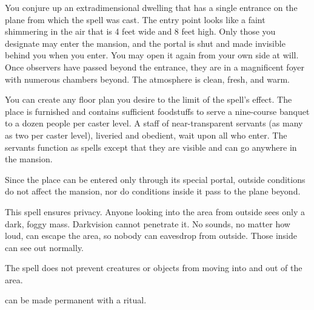 \spellrng{\rngclose}
\begin{spelleffect}
You conjure up an extradimensional dwelling that has a single entrance on the plane from which the spell was cast. The entry point looks like a faint shimmering in the air that is 4 feet wide and 8 feet high. Only those you designate may enter the mansion, and the portal is shut and made invisible behind you when you enter. You may open it again from your own side at will. Once observers have passed beyond the entrance, they are in a magnificent foyer with numerous chambers beyond. The atmosphere is clean, fresh, and warm.
\par You can create any floor plan you desire to the limit of the spell's effect. The place is furnished and contains sufficient foodstuffs to serve a nine-course banquet to a dozen people per caster level. A staff of near-transparent servants (as many as two per caster level), liveried and obedient, wait upon all who enter. The servants function as  spells except that they are visible and can go anywhere in the mansion.
\par Since the place can be entered only through its special portal, outside conditions do not affect the mansion, nor do conditions inside it pass to the plane beyond.
\end{spelleffect}

\spellrng{\rngclose}
\begin{spelleffect}
This spell ensures privacy. Anyone looking into the area from outside sees only a dark, foggy mass. Darkvision cannot penetrate it. No sounds, no matter how loud, can escape the area, so nobody can eavesdrop from outside. Those inside can see out normally.
\par The spell does not prevent creatures or objects from moving into and out of the area.
\end{spelleffect}
\begin{spellnotes}
 can be made permanent with a  ritual.
\end{spellnotes}

